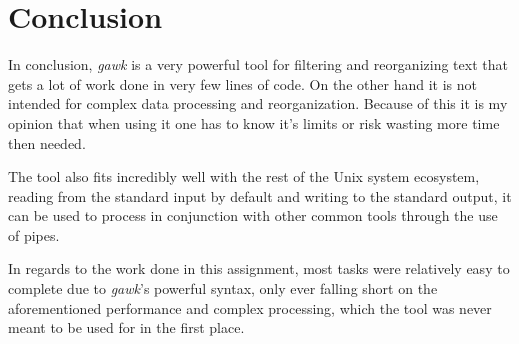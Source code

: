 \documentclass[a4paper]{report}
\begin{document}
\chapter{Conclusion}

In conclusion, \textit{gawk} is a very powerful tool for filtering and
reorganizing text that gets a lot of work done in very few lines of code. On
the other hand it is not intended for complex data processing and
reorganization. Because of this it is my opinion that when using it one has to
know it's limits or risk wasting more time then needed.

The tool also fits incredibly well with the rest of the Unix system ecosystem,
reading from the standard input by default and writing to the standard output,
it can be used to process in conjunction with other common tools through the
use of pipes.

In regards to the work done in this assignment, most tasks were relatively easy
to complete due to \textit{gawk}'s powerful syntax, only ever falling short on
the aforementioned performance and complex processing, which the tool was
never meant to be used for in the first place.



\end{document}
